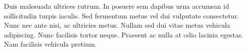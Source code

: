 Duis malesuada ultrices rutrum. In posuere sem dapibus urna accumsan id sollicitudin turpis iaculis. Sed fermentum metus vel dui vulputate consectetur. Nunc nec ante nisi, ac ultricies metus. Nullam sed dui vitae metus vehicula adipiscing. Nunc facilisis tortor neque. Praesent ac nulla at odio lacinia egestas. Nam facilisis vehicula pretium.
